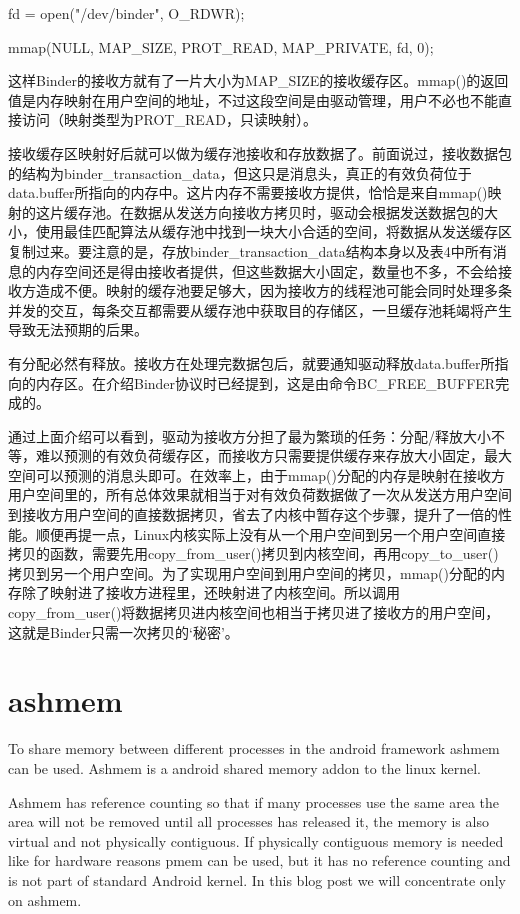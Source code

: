 \documentclass[a4paper,11pt]{article}
\begin{document}
fd = open("/dev/binder", O_RDWR);

mmap(NULL, MAP_SIZE, PROT_READ, MAP_PRIVATE, fd, 0);

这样Binder的接收方就有了一片大小为MAP_SIZE的接收缓存区。mmap()的返回值是内存映射在用户空间的地址，不过这段空间是由驱动管理，用户不必也不能直接访问（映射类型为PROT_READ，只读映射）。

接收缓存区映射好后就可以做为缓存池接收和存放数据了。前面说过，接收数据包的结构为binder_transaction_data，但这只是消息头，真正的有效负荷位于data.buffer所指向的内存中。这片内存不需要接收方提供，恰恰是来自mmap()映射的这片缓存池。在数据从发送方向接收方拷贝时，驱动会根据发送数据包的大小，使用最佳匹配算法从缓存池中找到一块大小合适的空间，将数据从发送缓存区复制过来。要注意的是，存放binder_transaction_data结构本身以及表4中所有消息的内存空间还是得由接收者提供，但这些数据大小固定，数量也不多，不会给接收方造成不便。映射的缓存池要足够大，因为接收方的线程池可能会同时处理多条并发的交互，每条交互都需要从缓存池中获取目的存储区，一旦缓存池耗竭将产生导致无法预期的后果。

有分配必然有释放。接收方在处理完数据包后，就要通知驱动释放data.buffer所指向的内存区。在介绍Binder协议时已经提到，这是由命令BC_FREE_BUFFER完成的。

通过上面介绍可以看到，驱动为接收方分担了最为繁琐的任务：分配/释放大小不等，难以预测的有效负荷缓存区，而接收方只需要提供缓存来存放大小固定，最大空间可以预测的消息头即可。在效率上，由于mmap()分配的内存是映射在接收方用户空间里的，所有总体效果就相当于对有效负荷数据做了一次从发送方用户空间到接收方用户空间的直接数据拷贝，省去了内核中暂存这个步骤，提升了一倍的性能。顺便再提一点，Linux内核实际上没有从一个用户空间到另一个用户空间直接拷贝的函数，需要先用copy_from_user()拷贝到内核空间，再用copy_to_user()拷贝到另一个用户空间。为了实现用户空间到用户空间的拷贝，mmap()分配的内存除了映射进了接收方进程里，还映射进了内核空间。所以调用copy_from_user()将数据拷贝进内核空间也相当于拷贝进了接收方的用户空间，这就是Binder只需一次拷贝的‘秘密’。


\section{ashmem}
To share memory between different processes in the android framework ashmem
can be used. Ashmem is a android shared memory addon to the linux kernel. 

Ashmem has reference counting so that if many processes use the same area the
area will not be removed until all processes has released it, the memory is
also virtual and not physically contiguous. If physically contiguous memory is
needed like for hardware reasons pmem can be used, but it has no reference
counting and is not part of standard Android kernel. 
In this blog post we will concentrate only on ashmem.
\end{document}
